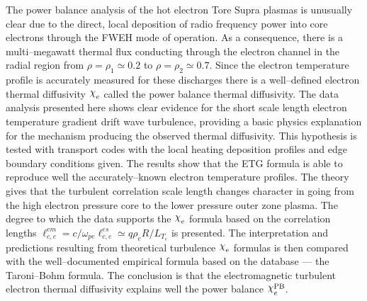 \documentclass[a4paper,openany,12pt]{book}
\def\chix{\raise.5ex\hbox{$\chi$}}
\begin{document}
The power balance analysis of the hot electron Tore Supra plasmas is unusually clear due to the direct, local deposition of radio frequency power into core electrons through the FWEH mode of operation. As a consequence, there is a multi--megawatt thermal flux conducting through the electron channel in the radial region from $\rho=\rho_1\simeq 0.2$ to $\rho=\rho_2\simeq 0.7$. Since the electron temperature profile is accurately measured for these discharges there is a well--defined electron thermal diffusivity $\chix_e$ called the power balance thermal diffusivity. The data analysis presented here shows clear evidence for the short scale length electron temperature gradient drift wave turbulence, providing a basic physics explanation for the mechanism producing the observed thermal diffusivity. This hypothesis is tested with transport codes with the local heating deposition profiles and edge boundary conditions given. The results show that the ETG formula is able to reproduce well the accurately--known electron temperature profiles. The theory gives that the turbulent correlation scale length changes character in going from the high electron pressure core to the lower pressure outer zone plasma. The degree to which the data supports the $\chix_e$ formula based on the correlation lengths $\ell_{c,e}^{em}=c/\omega_{pe}\ell_{c,e}^{es}\simeq q\rho_e R/L_{T_e}$ is presented. The interpretation and predictions resulting from theoretical turbulence $\chix_e$ formulas is then compared with the well--documented empirical formula based on the database --- the Taroni--Bohm formula. The conclusion is that the electromagnetic turbulent electron thermal diffusivity explains well the power balance $\chix_e^{\rm PB}$. 
\end{document}
